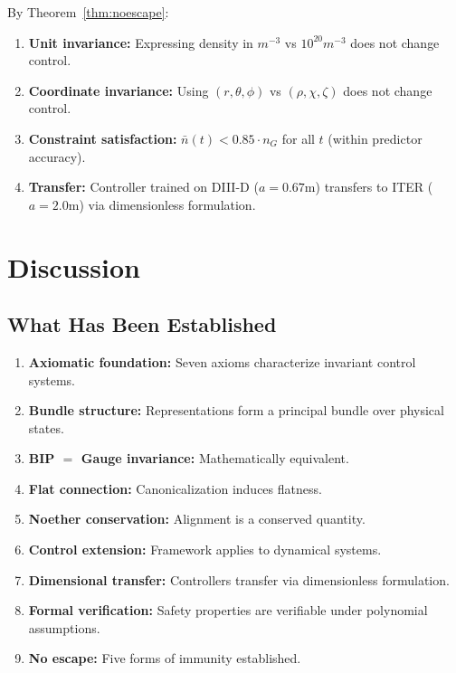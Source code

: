 \documentclass[11pt]{article}
\begin{document}
By Theorem~\ref{thm:noescape}:

\begin{enumerate}
    \item \textbf{Unit invariance:} Expressing density in $m^{-3}$ vs $10^{20}m^{-3}$ does not change control.

    \item \textbf{Coordinate invariance:} Using $(r, \theta, \phi)$ vs $(\rho, \chi, \zeta)$ does not change control.

    \item \textbf{Constraint satisfaction:} $\bar{n}(t) < 0.85 \cdot n_G$ for all $t$ (within predictor accuracy).

    \item \textbf{Transfer:} Controller trained on DIII-D ($a = 0.67$m) transfers to ITER ($a = 2.0$m) via
    dimensionless formulation.
\end{enumerate}

\section{Discussion}

\subsection{What Has Been Established}

\begin{enumerate}
    \item \textbf{Axiomatic foundation:} Seven axioms characterize invariant control systems.
    \item \textbf{Bundle structure:} Representations form a principal bundle over physical states.
    \item \textbf{BIP $=$ Gauge invariance:} Mathematically equivalent.
    \item \textbf{Flat connection:} Canonicalization induces flatness.
    \item \textbf{Noether conservation:} Alignment is a conserved quantity.
    \item \textbf{Control extension:} Framework applies to dynamical systems.
    \item \textbf{Dimensional transfer:} Controllers transfer via dimensionless formulation.
    \item \textbf{Formal verification:} Safety properties are verifiable under polynomial assumptions.
    \item \textbf{No escape:} Five forms of immunity established.
\end{enumerate}
\end{document}
